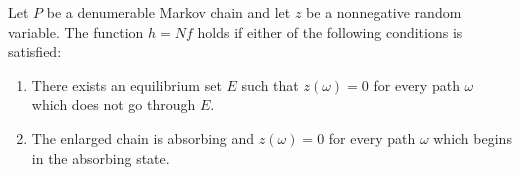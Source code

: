 Let $P$ be a denumerable Markov chain and let $z$ be a nonnegative random variable. The function $h = Nf$ holds if either of the following conditions is satisfied:

\begin{enumerate}
\item There exists an equilibrium set $E$ such that $z(\omega) = 0$ for every path $\omega$ which does not go through $E$.
\item The enlarged chain is absorbing and $z(\omega) = 0$ for every path $\omega$ which begins in the absorbing state.
\end{enumerate}
